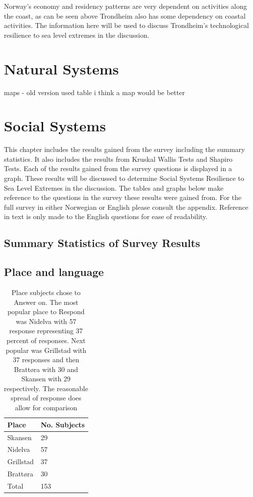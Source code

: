 Norway's economy and residency patterns are very dependent on activities along the coast\cite{aunan_strong_2008}, as can be seen above Trondheim also has some dependency on coastal activities. The information here will be used to discuss Trondheim's technological resilience to sea level extremes in the discussion. 


\section{Natural Systems}
maps - old version used table i think a map would be better



\section{Social Systems}

This chapter includes the results gained from the survey including the summary statistics. It also includes the results from Kruskal Wallis Tests and Shapiro Tests. Each of the results gained from the survey questions is displayed in a graph. These results will be discussed to determine Social Systems Resilience to Sea Level Extremes in the discussion. The tables and graphs below make reference to  the questions in the survey these results were gained from. For the full survey in either Norwegian or English please consult the appendix. Reference in text is only made to the English questions for ease of readability. 

\subsection{Summary Statistics of Survey Results}


\subsection{Place and language}

\begin{table}[h]
    \centering
    \begin{tabular}{|l|l|}
    \hline
    Place  & No. Subjects  \\ \hline
      Skansen   & 29    \\ \hline
      Nidelva & 57      \\ \hline
      Grillstad & 37       \\ \hline
      Brattøra & 30     \\ \hline
      Total & 153   \\ \hline
     \end{tabular}
    \caption{Place subjects chose to Answer on. The most popular place to Respond was Nidelva with 57 response representing 37 percent of responses. Next popular was Grillstad with 37 responses and then Brattøra with 30 and Skansen with 29 respectively. The reasonable spread of response does allow for comparison}
    \label{tab:place}
\end{table}
